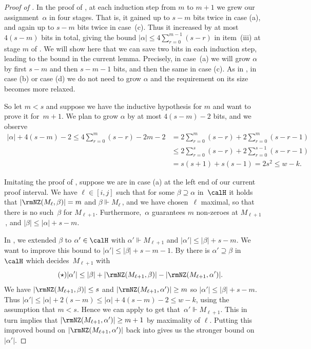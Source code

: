 \begin{proof}[Proof of ]
In the proof of , at each
induction step from $m$ to $m+1$
we grew our assignment~$\alpha$ in four
stages. That is, it gained 
up to $s-m$ bits twice in case (a), and again  up to
 $s-m$ bits twice in case~(c). Thus it increased by at most $4(s-m)$ bits
in total, giving the bound 
$|\alpha|\le 4 \sum_{r=0}^{m-1}(s-r)$ in item~(iii)
at stage $m$
of .
We will show here that we can save two bits in each induction
step, leading to the bound in the current lemma. 
Precisely, in case~(a) we will grow $\alpha$ by first $s-m$
and then $s-m-1$ bits, and then the same in case (c).
As in , in case (b) or case (d)
we do not need to grow $\alpha$ and
the requirement on its size becomes more relaxed.

So let $m<s$ and suppose we have the inductive hypothesis
for $m$ and want to prove it for~$m+1$. We plan to grow $\alpha$
by at most $4(s-m)-2$ bits, and we observe
\begin{align*} 
|\alpha|+4(s-m)-2 
\le 4 \sum_{r=0}^{m} (s-r) -2m-2
&= 2 \sum_{r=0}^{m} (s-r) + 2 \sum_{r=0}^{m} (s-r -1) \\
&\le 2 \sum_{r=0}^{s} (s-r) + 2 \sum_{r=0}^{s-1} (s-r -1) \\
&= s(s+1) + s(s-1) = 2s^2 \le w-k.
\end{align*}



Imitating the proof of ,
suppose we are in case (a) at the left end of our current proof interval.
We have  $\ell \in [i,j]$ such that for some $\beta \supseteq \alpha$ in~$\calH$
it holds that $|\rmNZ(M_\ell, \beta)| = m$ and $\beta \Vdash M_\ell$\,,
and we have chosen~$\ell$ maximal, so that there is no such~$\beta$ for $M_{\ell+1}$. 
Furthermore,~$\alpha$ guarantees $m$ non-zeroes at $M_{\ell+1}$\,, 
and $|\beta| \le |\alpha|+s-m$.

In , we extended $\beta$ to $\alpha' \in \calH$
with $\alpha' \Vdash M_{\ell+1}$ and $|\alpha'| \le |\beta|+s-m$. 
We want  to improve this bound to $|\alpha'| \le |\beta|+s-m-1$.
By  there is $\alpha' \supseteq \beta$ in $\calH$
which decides~$M_{\ell+1}$
with 
\begin{equation} \label{eq:bound_19} \tag{$\star$}
|\alpha'| \le |\beta|+|\rmNZ(M_{\ell+1},\beta)|-|\rmNZ(M_{\ell+1}, \alpha')|.
\end{equation}
We have $|\rmNZ(M_{\ell+1}, \beta)| \le s$ and
$|\rmNZ(M_{\ell+1}, \alpha')| \ge m$ so $|\alpha'| \le |\beta|+s-m$.
Thus $|\alpha'| \le |\alpha|+2(s-m) \le |\alpha|+4(s-m)-2 \le w-k$, using the assumption that $m<s$. Hence we can apply 
to get that~$\alpha' \Vdash M_{\ell+1}$.
This in turn implies that $|\rmNZ(M_{\ell+1}, \alpha')| \ge m+1$ by 
maximality of $\ell$.
Putting this improved bound on $|\rmNZ(M_{\ell+1}, \alpha')|$ 
back into %
%
%
gives us the stronger bound on $|\alpha'|$.


\end{proof}

